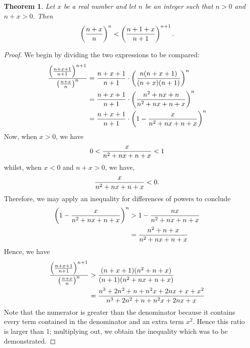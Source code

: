 \documentclass[12pt]{article}
\newtheorem{thm}{Theorem}
\begin{document}
\begin{thm}
Let $x$ be a real number and let $n$ be an integer such that
$n > 0$ and $n + x > 0$.  Then
\[
\left( {n + x \over n} \right)^n < 
\left( {n + 1 + x \over n + 1} \right)^{n+1}.
\]
\end{thm}

\begin{proof}
We begin by dividing the two expressions to be compared:
\begin{align*}
{\left( {n + x + 1 \over n + 1} \right)^{n+1}  \over
 \left( {n + x \over n} \right)^n} &=
 {n + x + 1 \over n + 1} \cdot
 \left( {n (n + x + 1) \over (n + x) (n + 1)} \right)^n \\ &=
 {n + x + 1 \over n + 1} \cdot
\left( {n^2 + nx + n \over n^2 + n x + n + x} \right)^n \\ &=
 {n + x + 1 \over n + 1} \cdot
\left( 1 - {x \over n^2 + n x + n + x} \right)^n
\end{align*}
Now, when $x > 0$, we have
\[
0 < {x \over n^2 + n x + n + x} < 1
\]
whilst, when $x < 0$ and $n + x > 0$, we have,
\[
{x \over n^2 + n x + n + x} < 0 .
\]
Therefore, we may apply an inequality for differences of powers to conclude
\begin{align*}
\left( 1 - { x \over n^2 + n x + n + x} \right)^n &>
1 - { n x \over n^2 + n x + n + x} \\ &=
{n^2 + n + x \over n^2 + n x + n + x}
\end{align*}
Hence, we have
\begin{align*}
{\left( {n + x + 1 \over n + 1} \right)^{n+1}  \over
 \left( {n + x \over n} \right)^n} &>
{(n + x + 1) (n^2 + n + x ) \over (n + 1) (n^2 + n x + n + x)} \\ &=
{n^3 + 2 n^2 + n + n^2 x + 2 n x + x + x^2 \over
n^3 + 2 n^2 + n + n^2 x + 2 n x + x}
\end{align*}
Note that the numerator is greater than the denominator because
it contains every term contained in the denominator and an extra
term $x^2$.  Hence this ratio is larger than $1$; multiplying out,
we obtain the inequality which was to be demonstrated.
\end{proof}
\end{document}
